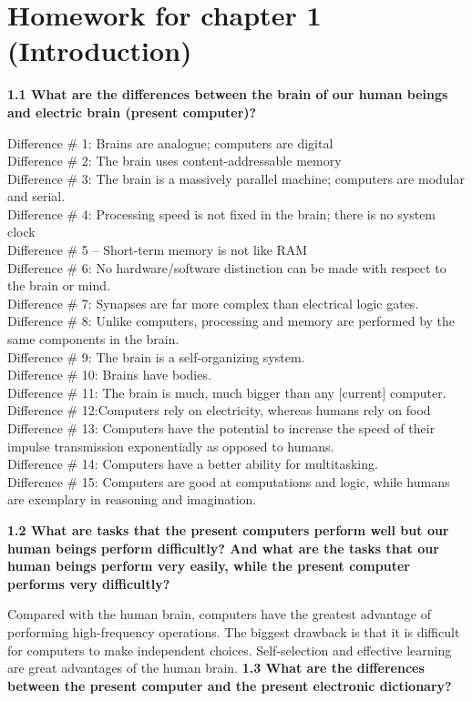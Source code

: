 \section{Homework for chapter 1 (Introduction)}
\noindent \textbf{1.1 What are the differences between the brain of our human beings and electric brain (present computer)?}

\noindent Difference \# 1: Brains are analogue; computers are digital\\
Difference \# 2: The brain uses content-addressable memory\\
Difference \# 3: The brain is a massively parallel machine; computers are modular and serial.\\
Difference \# 4: Processing speed is not fixed in the brain; there is no system clock\\
Difference \# 5 – Short-term memory is not like RAM\\
Difference \# 6: No hardware/software distinction can be made with respect to the brain or mind.\\
Difference \# 7: Synapses are far more complex than electrical logic gates.\\
Difference \# 8: Unlike computers, processing and memory are performed by the same components in the brain.\\
Difference \# 9: The brain is a self-organizing system.\\
Difference \# 10: Brains have bodies.\\
Difference \# 11: The brain is much, much bigger than any [current] computer.\\
Difference \# 12:Computers rely on electricity, whereas humans rely on food\\
Difference \# 13: Computers have the potential to increase the speed of their impulse transmission exponentially as opposed to humans.\\
Difference \# 14: Computers have a better ability for multitasking.\\
Difference \# 15: Computers are good at computations and logic, while humans are exemplary in reasoning and imagination.

\noindent\textbf{1.2 What are tasks that the present computers perform well but our human beings perform
difficultly? And what are the tasks that our human beings perform very easily, while the
present computer performs very difficultly?}

\noindent Compared with the human brain, computers have the greatest advantage of performing high-frequency operations. The biggest drawback is that it is difficult for computers to make independent choices. Self-selection and effective learning are great advantages of the human brain.
\newpage
\noindent\textbf{1.3 What are the differences between the present computer and the present electronic dictionary?}

